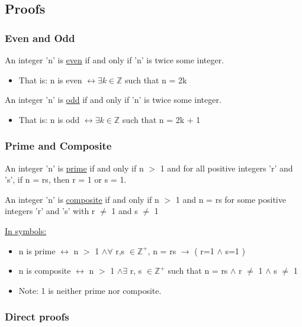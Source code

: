 \documentclass{article}
\begin{document}
\subsection{Proofs}

\subsubsection{Even and Odd}

An integer 'n' is \underline{even} if and only if 'n' is twice some integer.
\begin{itemize}
\item That is: n is even $\leftrightarrow \exists k \in \mathbb{Z}$ such that n = 2k
\end{itemize}

An integer 'n' is \underline{odd} if and only if 'n' is twice some integer.
\begin{itemize}
\item That is: n is odd $\leftrightarrow \exists k \in \mathbb{Z}$ such that n = 2k + 1
\end{itemize}

\subsubsection{Prime and Composite}

An integer 'n' is \underline{prime} if and only if n $>$ 1 and for all positive integers 'r' and 's', if n = rs, then r = 1 or s = 1.

An integer 'n' is \underline{composite} if and only if n $>$ 1 and n = rs for some positive integers 'r' and 's' with r $\neq$ 1 and s $\neq$ 1

\underline{In symbols:}

\begin{itemize}
\item n is prime $\leftrightarrow$ n $>$ 1 $\wedge \forall$ r,s $\in \mathbb{Z}^{+}$, n = rs $\rightarrow$ ( r=1 $\wedge$ s=1 )
\item n is composite $\leftrightarrow$ n $>$ 1 $\wedge \exists$ r, s $\in \mathbb{Z}^{+}$ such that n = rs $\wedge$ r $\neq$ 1 $\wedge$ s $\neq$ 1
\item Note: 1 is neither prime nor composite.
\end{itemize}

\subsubsection{Direct proofs}
\end{document}
